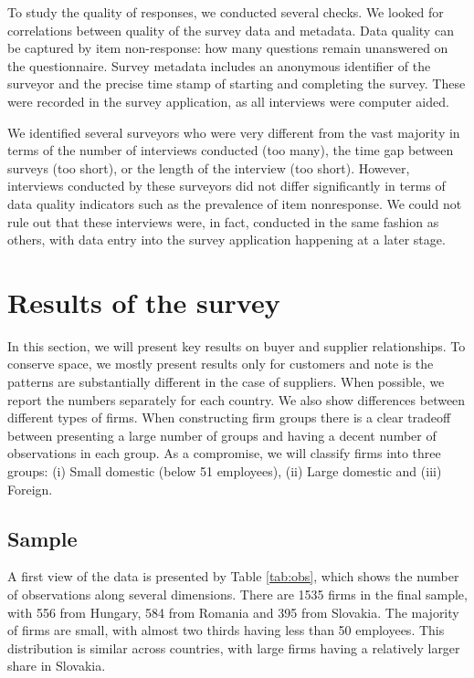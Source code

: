 \documentclass[final, dvipsnames, authoryear,12pt]{elsarticle}
\begin{document}
To study the quality of responses, we conducted several checks. We looked for correlations between quality of the survey data and metadata. Data quality can be captured by item non-response: how many questions remain unanswered on the questionnaire. Survey metadata includes an anonymous identifier of the surveyor and the precise time stamp of starting and completing the survey. These were recorded in the survey application, as all interviews were computer aided. 

We identified several surveyors who were very different from the vast majority in terms of the number of interviews conducted (too many), the time gap between surveys (too short), or the length of the interview (too short). However, interviews conducted by these surveyors did not differ significantly in terms of data quality indicators such as the prevalence of item nonresponse. We could not rule out that these interviews were, in fact, conducted in the same fashion as others, with data entry into the survey application happening at a later stage.


\section{Results of the survey}
\label{sec:desc}

In this section, we will present key results on buyer and supplier relationships. To conserve space, we mostly present results only for customers and note is the patterns are substantially different in the case of suppliers. When possible, we report the numbers separately for each country. We also show differences between different types of firms. When constructing firm groups there is a clear tradeoff between presenting a large number of groups and having a decent number of observations in each group. As a compromise, we will classify firms into three groups: (i) Small domestic (below 51 employees), (ii) Large domestic and (iii) Foreign. 



\subsection{Sample}


A first view of the data is presented by Table \ref{tab:obs}, which shows the number of observations along several dimensions. There are 1535 firms in the final sample, with 556 from Hungary, 584 from Romania and 395 from Slovakia. The majority of firms are small, with almost two thirds having less than 50 employees. This distribution is similar across countries, with large firms having a relatively larger share in Slovakia.
\end{document}
